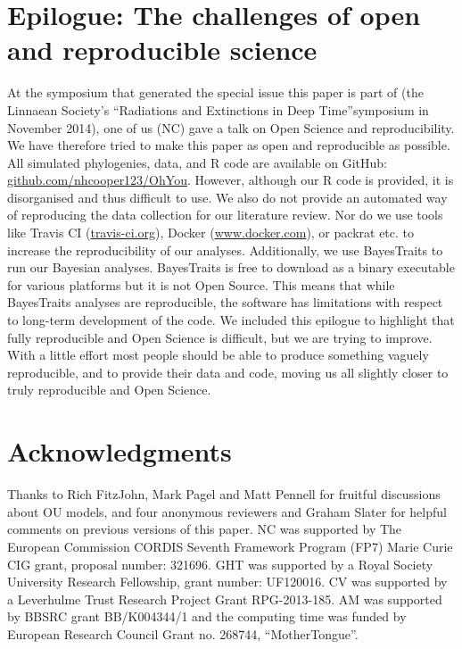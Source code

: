 \documentclass[a4paper,12pt]{article}
\begin{document}
\section{Epilogue: The challenges of open and reproducible science}
  At the symposium that generated the special issue this paper is part of (the Linnaean Society's ``Radiations and Extinctions in Deep Time''symposium in November 2014), one of us (NC) gave a talk on Open Science and reproducibility. 
  We have therefore tried to make this paper as open and reproducible as possible. 
  All simulated phylogenies, data, and R code are available on GitHub: \href{https://github.com/nhcooper123/OhYou}{github.com/nhcooper123/OhYou}. However, although our R code is provided, it is disorganised and thus difficult to use. 
  We also do not provide an automated way of reproducing the data collection for our literature review. 
  Nor do we use tools like Travis CI (\href{https://travis-ci.org}{travis-ci.org}), Docker (\href{www.docker.com}{www.docker.com}), or packrat \citep{Ushey:2015aa} etc. to increase the reproducibility of our analyses. 
  Additionally, we use BayesTraits to run our Bayesian analyses. 
  BayesTraits is free to download as a binary executable for various platforms but it is not Open Source. 
  This means that while BayesTraits analyses are reproducible, the software has limitations with respect to long-term development of the code. 
  We included this epilogue to highlight that fully reproducible and Open Science is difficult, but we are trying to improve.
  With a little effort most people should be able to produce something vaguely reproducible, and to provide their data and code, moving us all slightly closer to truly reproducible and Open Science.

\section{Acknowledgments}
  Thanks to Rich FitzJohn, Mark Pagel and Matt Pennell for fruitful discussions about OU models, and four anonymous reviewers and Graham Slater for helpful comments on previous versions of this paper. 
  NC was supported by The European Commission CORDIS Seventh Framework Program (FP7) Marie Curie CIG grant, proposal number: 321696. 
  GHT was supported by a Royal Society University Research Fellowship, grant number: UF120016. 
  CV was supported by a Leverhulme Trust Research Project Grant RPG-2013-185. 
  AM was supported by BBSRC grant BB/K004344/1 and the computing time was funded by European Research Council Grant no. 268744, ``MotherTongue''.
\end{document}
